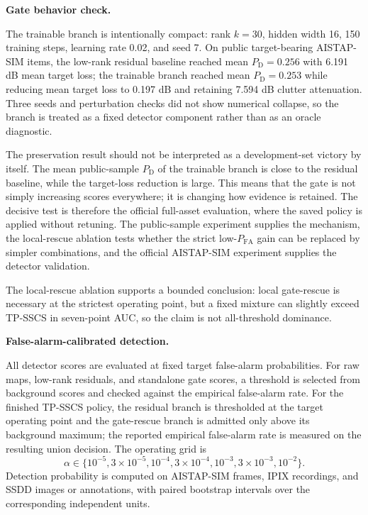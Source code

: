 \documentclass[journal]{IEEEtran}
\begin{document}
\noindent\textbf{Gate behavior check.}

The trainable branch is intentionally compact: rank $k=30$, hidden width 16, 150 training steps, learning rate 0.02, and seed 7. On public target-bearing AISTAP-SIM items, the low-rank residual baseline reached mean $P_{\mathrm{D}}=0.256$ with 6.191 dB mean target loss; the trainable branch reached mean $P_{\mathrm{D}}=0.253$ while reducing mean target loss to 0.197 dB and retaining 7.594 dB clutter attenuation. Three seeds and perturbation checks did not show numerical collapse, so the branch is treated as a fixed detector component rather than as an oracle diagnostic.

The preservation result should not be interpreted as a development-set victory by itself. The mean public-sample $P_{\mathrm{D}}$ of the trainable branch is close to the residual baseline, while the target-loss reduction is large. This means that the gate is not simply increasing scores everywhere; it is changing how evidence is retained. The decisive test is therefore the official full-asset evaluation, where the saved policy is applied without retuning. The public-sample experiment supplies the mechanism, the local-rescue ablation tests whether the strict low-$P_{\mathrm{FA}}$ gain can be replaced by simpler combinations, and the official AISTAP-SIM experiment supplies the detector validation.

The local-rescue ablation supports a bounded conclusion: local gate-rescue is necessary at the strictest operating point, but a fixed mixture can slightly exceed TP-SSCS in seven-point AUC, so the claim is not all-threshold dominance.

\noindent\textbf{False-alarm-calibrated detection.}

All detector scores are evaluated at fixed target false-alarm probabilities. For raw maps, low-rank residuals, and standalone gate scores, a threshold is selected from background scores and checked against the empirical false-alarm rate. For the finished TP-SSCS policy, the residual branch is thresholded at the target operating point and the gate-rescue branch is admitted only above its background maximum; the reported empirical false-alarm rate is measured on the resulting union decision. The operating grid is
\begin{equation}
    \alpha \in \{10^{-5}, 3\times10^{-5}, 10^{-4}, 3\times10^{-4},
    10^{-3}, 3\times10^{-3}, 10^{-2}\}.
\end{equation}
Detection probability is computed on AISTAP-SIM frames, IPIX recordings, and SSDD images or annotations, with paired bootstrap intervals over the corresponding independent units.
\end{document}
